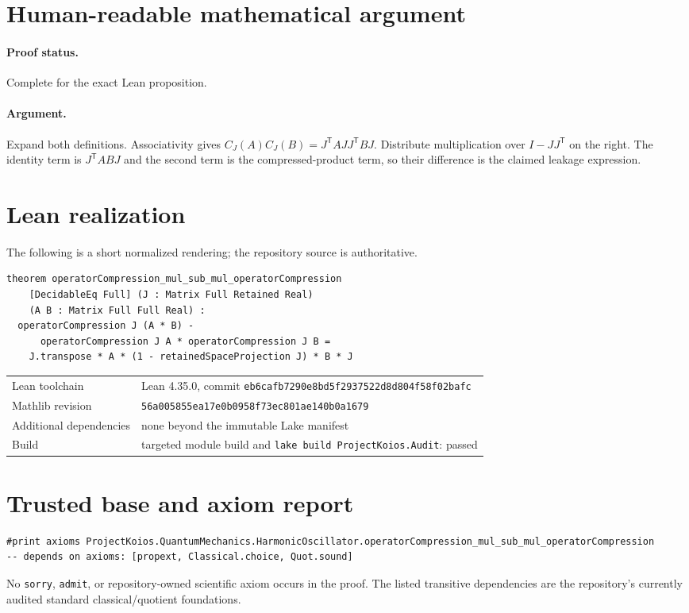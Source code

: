 \documentclass[11pt]{article}
\begin{document}
\section{Human-readable mathematical argument}
\paragraph{Proof status.} Complete for the exact Lean proposition.
\paragraph{Argument.} Expand both definitions.  Associativity gives $C_J(A)C_J(B)=J^{\mathsf T}AJJ^{\mathsf T}BJ$.  Distribute multiplication over $I-JJ^{\mathsf T}$ on the right.  The identity term is $J^{\mathsf T}ABJ$ and the second term is the compressed-product term, so their difference is the claimed leakage expression.

\section{Lean realization}
The following is a short normalized rendering; the repository source is authoritative.
\begin{lstlisting}
theorem operatorCompression_mul_sub_mul_operatorCompression
    [DecidableEq Full] (J : Matrix Full Retained Real)
    (A B : Matrix Full Full Real) :
  operatorCompression J (A * B) -
      operatorCompression J A * operatorCompression J B =
    J.transpose * A * (1 - retainedSpaceProjection J) * B * J
\end{lstlisting}
\begin{tabularx}{\textwidth}{@{}lY@{}}\toprule
Lean toolchain & Lean 4.35.0, commit \texttt{eb6cafb7290e8bd5f2937522d8d804f58f02bafc} \\
Mathlib revision & \texttt{56a005855ea17e0b0958f73ec801ae140b0a1679} \\
Additional dependencies & none beyond the immutable Lake manifest \\
Build & targeted module build and \texttt{lake build ProjectKoios.Audit}: passed \\
\bottomrule\end{tabularx}

\section{Trusted base and axiom report}
\begin{lstlisting}
#print axioms ProjectKoios.QuantumMechanics.HarmonicOscillator.operatorCompression_mul_sub_mul_operatorCompression
-- depends on axioms: [propext, Classical.choice, Quot.sound]
\end{lstlisting}
No \texttt{sorry}, \texttt{admit}, or repository-owned scientific axiom occurs in the
proof. The listed transitive dependencies are the repository's currently audited standard
classical/quotient foundations.
\end{document}
